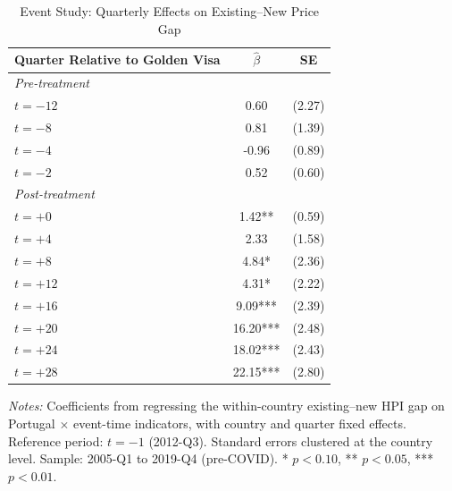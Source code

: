 \begin{table}[H]
\centering
\caption{Event Study: Quarterly Effects on Existing--New Price Gap}
\label{tab:event_study}
\begin{threeparttable}
\begin{tabular}{lcc}
\toprule
Quarter Relative to Golden Visa & $\hat{\beta}$ & SE \\
\midrule
\multicolumn{3}{l}{\textit{Pre-treatment}} \\
$t = -12$ & 0.60 & (2.27) \\
$t = -8$ & 0.81 & (1.39) \\
$t = -4$ & -0.96 & (0.89) \\
$t = -2$ & 0.52 & (0.60) \\
\midrule
\multicolumn{3}{l}{\textit{Post-treatment}} \\
$t = +0$ & 1.42** & (0.59) \\
$t = +4$ & 2.33 & (1.58) \\
$t = +8$ & 4.84* & (2.36) \\
$t = +12$ & 4.31* & (2.22) \\
$t = +16$ & 9.09*** & (2.39) \\
$t = +20$ & 16.20*** & (2.48) \\
$t = +24$ & 18.02*** & (2.43) \\
$t = +28$ & 22.15*** & (2.80) \\
\bottomrule
\end{tabular}
\begin{tablenotes}[flushleft]
\small
\item \textit{Notes:} Coefficients from regressing the within-country existing--new HPI gap on Portugal $\times$ event-time indicators, with country and quarter fixed effects. Reference period: $t = -1$ (2012-Q3). Standard errors clustered at the country level. Sample: 2005-Q1 to 2019-Q4 (pre-COVID). * $p < 0.10$, ** $p < 0.05$, *** $p < 0.01$.
\end{tablenotes}
\end{threeparttable}
\end{table}

